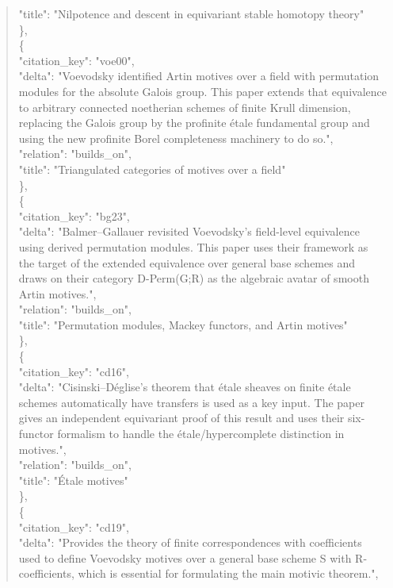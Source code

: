 \documentclass[11pt]{article}
\begin{document}
\begin{quote}
      "title": "Nilpotence and descent in equivariant stable homotopy theory"\\
    \},\\
    \{\\
      "citation\_key": "voe00",\\
      "delta": "Voevodsky identified Artin motives over a field with permutation modules for the absolute Galois group. This paper extends that equivalence to arbitrary connected noetherian schemes of finite Krull dimension, replacing the Galois group by the profinite étale fundamental group and using the new profinite Borel completeness machinery to do so.",\\
      "relation": "builds\_on",\\
      "title": "Triangulated categories of motives over a field"\\
    \},\\
    \{\\
      "citation\_key": "bg23",\\
      "delta": "Balmer--Gallauer revisited Voevodsky's field-level equivalence using derived permutation modules. This paper uses their framework as the target of the extended equivalence over general base schemes and draws on their category D-Perm(G;R) as the algebraic avatar of smooth Artin motives.",\\
      "relation": "builds\_on",\\
      "title": "Permutation modules, Mackey functors, and Artin motives"\\
    \},\\
    \{\\
      "citation\_key": "cd16",\\
      "delta": "Cisinski--Déglise's theorem that étale sheaves on finite étale schemes automatically have transfers is used as a key input. The paper gives an independent equivariant proof of this result and uses their six-functor formalism to handle the étale/hypercomplete distinction in motives.",\\
      "relation": "builds\_on",\\
      "title": "Étale motives"\\
    \},\\
    \{\\
      "citation\_key": "cd19",\\
      "delta": "Provides the theory of finite correspondences with coefficients used to define Voevodsky motives over a general base scheme S with R-coefficients, which is essential for formulating the main motivic theorem.",\\

\end{quote}
\end{document}
